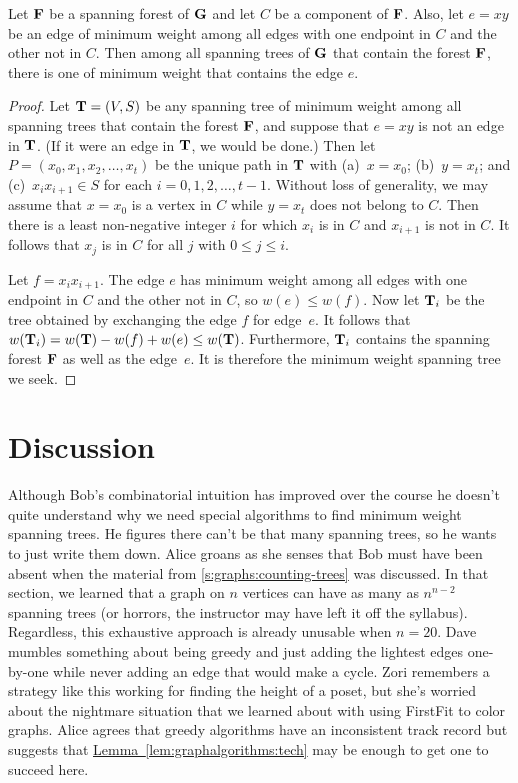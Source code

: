 \begin{lemma}\label{lem:graphalgorithms:tech}
  Let $\mathbf{F}$ be a spanning forest of $\mathbf{G}$ and let $C$ be a component
  of $\mathbf{F}$.  Also, let $e=xy$ be an edge of minimum weight among all
  edges with one endpoint in $C$ and the other not in $C$.  Then among
  all spanning trees of $\mathbf{G}$ that contain the forest $\mathbf{F}$, there
  is one of minimum weight that contains the edge $e$.
\end{lemma}
\begin{proof}
  Let $\mathbf{T}=(V,S)$ be any spanning tree of minimum weight among all
  spanning trees that contain the forest $\mathbf{F}$, and suppose that
  $e=xy$ is not an edge in $\mathbf{T}$. (If it were an edge in $\mathbf{T}$, we
  would be done.) Then let $P=(x_0,x_1,x_2,\dots,x_t)$ be the unique
  path in $\mathbf{T}$ with (a)~$x=x_0$; (b)~$y=x_t$; and (c)~$x_ix_{i+1}\in
  S$ for each $i=0,1,2,\dots,t-1$.  Without loss of generality, we may
  assume that $x=x_0$ is a vertex in $C$ while $y=x_t$ does not
  belong to $C$.  Then there is a
  least non-negative integer $i$ for which $x_i$ is in $C$ and
  $x_{i+1}$ is not in $C$.  It follows that $x_j$ is in $C$ for all $j$ with
  $0\le j\le i$.

  Let $f=x_ix_{i+1}$. The edge $e$ has minimum weight among all edges
  with one endpoint in $C$ and the other not in $C$, so $w(e)\le
  w(f)$.  Now let $\mathbf{T}_i$ be the tree obtained by exchanging the edge
  $f$ for edge~$e$.  It follows that $w(\mathbf{T}_i) = w(\mathbf{T}) - w(f)
  +w(e)\le w(\mathbf{T})$.  Furthermore, $\mathbf{T}_i$ contains the spanning
  forest $\mathbf{F}$ as well as the edge~$e$. It is therefore the minimum
  weight spanning tree we seek.
\end{proof}

\section{Discussion}
  Although Bob's combinatorial intuition has improved over the course
  he doesn't quite understand why we need
  special algorithms to find minimum weight spanning trees. He figures
  there can't be that many spanning trees, so he wants to just write
  them down. Alice groans as she senses that Bob must have
  been absent when the material from 
  \autoref{s:graphs:counting-trees}  was discussed.  In that section,
  we learned that a graph on $n$ vertices can have as many as $n^{n-2}$
  spanning trees (or horrors, the instructor may have left it off the
  syllabus).  Regardless, this exhaustive approach is already unusable
  when $n = 20$. Dave mumbles something about being greedy and just adding the
  lightest edges one-by-one while never adding an edge that would make
  a cycle. Zori remembers a strategy like this working for finding
  the height of a poset, but she's worried about the nightmare
  situation that we learned about with using FirstFit to color
  graphs. Alice agrees that greedy algorithms have an inconsistent
  track record but suggests that
  \hyperref[lem:graphalgorithms:tech]{Lemma~\ref*{lem:graphalgorithms:tech}}
  may be enough to get one to succeed here.

